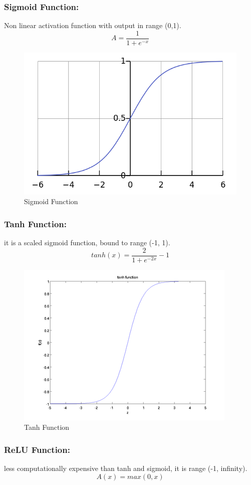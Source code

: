 \documentclass[12pt]{report}
\begin{document}
    \subsubsection{Sigmoid Function:}
    Non linear activation function with output in range (0,1).
    $$ A = \frac{1}{1+e^{-x}} $$

    \begin{figure} [h]
        \centering
        \includegraphics[width=.6\textwidth]{./images/sigmoid.png}
        \caption{Sigmoid Function}
        \label{fig:sigmoid}
    \end{figure}

    \subsubsection{Tanh Function:}
     it is a scaled sigmoid function, bound to range (-1, 1).
    $$ tanh(x) = \frac{2}{1+ e^{-2x}} - 1 $$

    \begin{figure} [h]
        \centering
        \includegraphics[width=.5\textwidth]{./images/tanh.png}
        \caption{Tanh Function}
        \label{fig:tanh}
    \end{figure}

    \subsubsection{ReLU Function:}
    less computationally expensive than tanh and sigmoid, it is range (-1, infinity).
    $$ A(x) = max(0,x) $$
\end{document}
